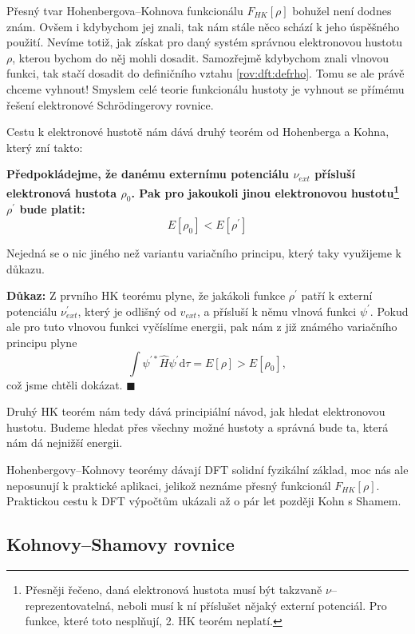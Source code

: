 Přesný tvar Hohenbergova--Kohnova funkcionálu $F_{HK}[\rho]$ bohužel není dodnes znám. 
Ovšem i kdybychom jej znali, tak nám stále něco schází k jeho úspěšného použití. Nevíme totiž, jak získat pro daný systém správnou elektronovou hustotu $\rho$, kterou bychom do něj mohli dosadit. Samozřejmě kdybychom znali vlnovou funkci, tak stačí dosadit do definičního vztahu \eqref{rov:dft:defrho}. Tomu se ale právě chceme vyhnout! Smyslem celé teorie funkcionálu hustoty je vyhnout se přímému řešení elektronové Schr\"odingerovy rovnice.

Cestu k elektronové hustotě nám dává druhý teorém od Hohenberga a Kohna, který zní takto:

\bigskip
\textbf{Předpokládejme, že danému externímu potenciálu $\nu_{ext}$ přísluší elektronová hustota $\rho_0$. Pak pro jakoukoli jinou elektronovou hustotu\footnote{Přesněji řečeno, daná elektronová hustota musí být takzvaně $\nu$--{reprezentovatelná}, neboli musí k ní příslušet nějaký externí potenciál. Pro funkce, které toto nesplňují, 2. HK teorém neplatí.} $\rho^{\prime}$ bude platit:}
\begin{equation}
E[\rho_0] < E[\rho^{\prime}]
\label{rov:dft:HK2}
\end{equation}

Nejedná se o nic jiného než variantu variačního principu, který taky využijeme k důkazu.

\bigskip
\textbf{Důkaz:} Z prvního HK teorému plyne, že jakákoli funkce $\rho^{\prime}$ patří k externí potenciálu $\nu_{ext}^{\prime}$, který je odlišný od $v_{ext}$, a přísluší k němu vlnová funkci $\psi^{\prime}$. Pokud ale pro tuto vlnovou funkci vyčíslíme energii, pak nám z již známého variačního principu plyne
\begin{equation}
\int \psi^{\prime *} \hat{H} \psi^{\prime} \mathrm{d}\tau = E[\rho] > E [\rho_0],
\end{equation}
což jsme chtěli dokázat. \hfill {\footnotesize $\blacksquare$}

Druhý HK teorém nám tedy dává principiální návod, jak hledat elektronovou hustotu. Budeme hledat přes všechny možné hustoty a správná bude ta, která nám dá nejnižší energii.

Hohenbergovy--Kohnovy teorémy dávají DFT solidní fyzikální základ, moc nás ale neposunují k praktické aplikaci, jelikož neznáme přesný funkcionál $F_{HK}[\rho]$.
Praktickou cestu k DFT výpočtům ukázali až o pár let později Kohn s Shamem.

\subsection{Kohnovy--Shamovy rovnice}

